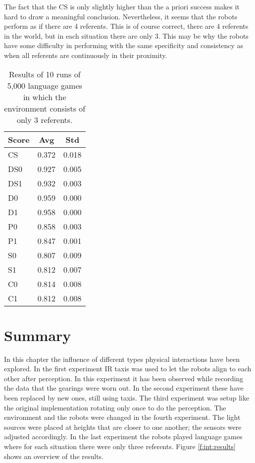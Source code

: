 \p
The fact that the CS is only slightly higher than the a priori success makes it hard to draw a meaningful conclusion. Nevertheless, it seems that the robots perform as if there are 4 referents. This is of course correct, there are 4 referents in the world, but in each situation there are only 3. This may be why the robots have some difficulty in performing with the same specificity and consistency as when all referents are continuously in their proximity.

\begin{table}
\centering
\begin{tabular}{||l|c|c||}
\hline\hline
Score & Avg & Std\\\hline
CS & 0.372 & 0.018\\\hline
DS0 & 0.927 & 0.005\\\hline
DS1 & 0.932 & 0.003\\\hline
D0 & 0.959 & 0.000\\\hline
D1 & 0.958 & 0.000\\\hline
P0 & 0.858 & 0.003\\\hline
P1 & 0.847 & 0.001\\\hline
S0 & 0.807 & 0.009\\\hline
S1 & 0.812 & 0.007\\\hline
C0 & 0.814 & 0.008\\\hline
C1 & 0.812 & 0.008\\\hline
\hline
\end{tabular}
\caption{Results of 10 runs of 5,000 language games in which the environment consists of only 3 referents.}
\label{t:int:3refs}
\end{table}


\section{Summary}

In this chapter the influence of different types physical interactions have been explored. In the first experiment IR taxis was used to let the robots align to each other after perception. In this experiment it has been observed while recording the data that the gearings were worn out. In the second experiment these have been replaced by new ones, still using taxis. The third experiment was setup like the original implementation \cite{steelsvogt:1997} rotating only once to do the perception. The environment and the robots were changed in the fourth experiment. The light sources were placed at heights that are closer to one another; the sensors were adjusted accordingly. In the last experiment the robots played language games where for each situation there were only three referents. Figure \ref{f:int:results} shows an overview of the results.


